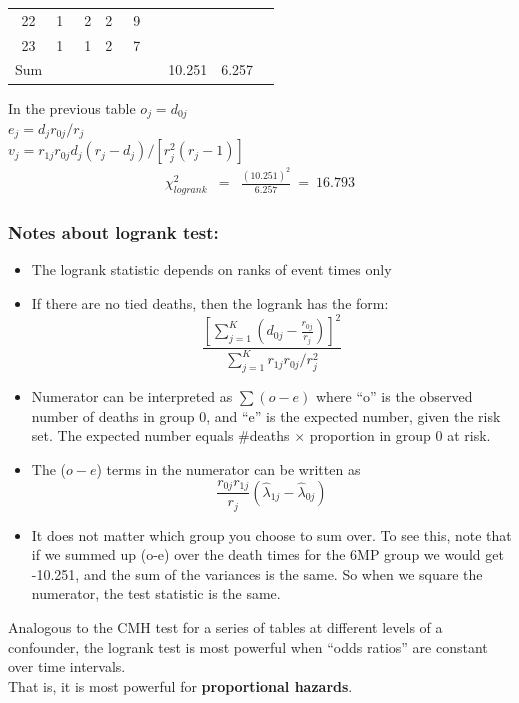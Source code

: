 \documentclass[11pt,slidesonly,semrot,portrait,palatino]{book}
\begin{document}
{\begin{center}
\begin{tabular}{ccccccccc}
 22   &  1    &  ~2   &    2    &   ~9  & \\
 23   &  1    &  ~1   &    2    &   ~7  & \\ \hline
Sum   &       &       &         &       &    & 10.251 & 6.257 \\
\end{tabular}
\end{center}
In the previous table
$o_j = d_{0j}$\\[1ex]
$e_j = d_j r_{0j}/r_j$ \\[1ex]
$v_j = r_{1j} r_{0j} d_j (r_j-d_j)/[r_j^2(r_j-1)]$
\begin{eqnarray*}
\chi^2_{logrank} & = & \frac{(10.251)^2}{6.257} ~=~ 16.793
\end{eqnarray*}
\subsubsection{Notes about logrank test:}
\begin{itemize}
\item The logrank statistic depends on ranks of event times only
\item If there are no tied deaths, then the logrank has the form:
\[    \frac{[\sum_{j=1}^K (d_{0j} - \frac{r_{0j}}{r_j})]^2}
        {\sum_{j=1}^K r_{1j}r_{0j}/r_j^2}  \]
\item  Numerator can be interpreted as $\sum (o-e)$ where
``o'' is the observed number of deaths in group 0, and
``e'' is the expected number, given the risk set.  The expected
number equals \#deaths $\times$ proportion in group 0
at risk.
\item  The ($o-e$) terms in the numerator  can be written as
\[   \frac{r_{0j}r_{1j}}{r_j}(\hat\lambda_{1j} - \hat\lambda_{0j} ) \]

\item  It does not matter which group you choose to sum over.
 To see this, note that if we summed up (o-e) over the death
times for the 6MP group we would get -10.251, and the sum of the
variances is the same.  So when we square the numerator, the test
statistic is the same.
\end{itemize}
Analogous to the CMH test for a series of tables at
different levels of a confounder, the logrank test is most powerful when
``odds ratios'' are constant over time intervals.
\\[2ex]
That is, it is most powerful for {\bf proportional hazards}.
}
\end{document}
